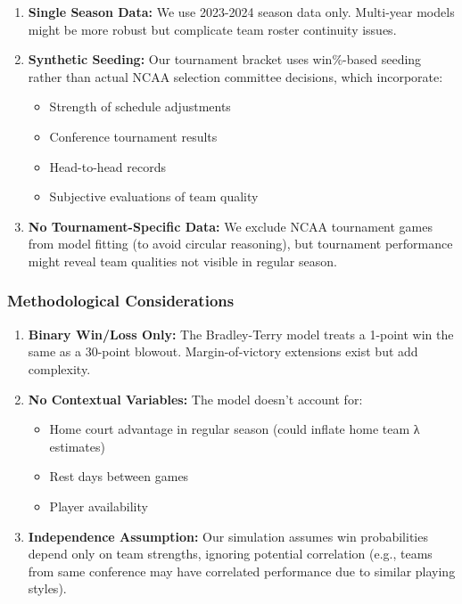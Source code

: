 \documentclass[
]{article}
\providecommand{\tightlist}{%
  \setlength{\itemsep}{0pt}\setlength{\parskip}{0pt}}
\begin{document}
\begin{enumerate}
\def\labelenumi{\arabic{enumi}.}
\item
  \textbf{Single Season Data:} We use 2023-2024 season data only.
  Multi-year models might be more robust but complicate team roster
  continuity issues.
\item
  \textbf{Synthetic Seeding:} Our tournament bracket uses win\%-based
  seeding rather than actual NCAA selection committee decisions, which
  incorporate:

  \begin{itemize}
  \tightlist
  \item
    Strength of schedule adjustments
  \item
    Conference tournament results
  \item
    Head-to-head records
  \item
    Subjective evaluations of team quality
  \end{itemize}
\item
  \textbf{No Tournament-Specific Data:} We exclude NCAA tournament games
  from model fitting (to avoid circular reasoning), but tournament
  performance might reveal team qualities not visible in regular season.
\end{enumerate}

\subsubsection{Methodological
Considerations}\label{methodological-considerations}

\begin{enumerate}
\def\labelenumi{\arabic{enumi}.}
\item
  \textbf{Binary Win/Loss Only:} The Bradley-Terry model treats a
  1-point win the same as a 30-point blowout. Margin-of-victory
  extensions exist but add complexity.
\item
  \textbf{No Contextual Variables:} The model doesn't account for:

  \begin{itemize}
  \tightlist
  \item
    Home court advantage in regular season (could inflate home team λ
    estimates)
  \item
    Rest days between games
  \item
    Player availability
  \end{itemize}
\item
  \textbf{Independence Assumption:} Our simulation assumes win
  probabilities depend only on team strengths, ignoring potential
  correlation (e.g., teams from same conference may have correlated
  performance due to similar playing styles).
\end{enumerate}
\end{document}
